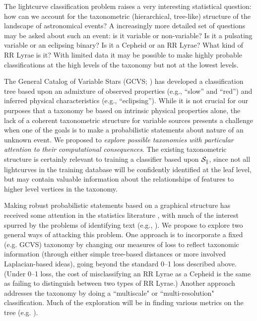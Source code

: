The lightcurve classification problem raises a very interesting statistical
question: how can we account for the taxonometric (hierarchical, tree-like)
structure of the landscape of astronomical events? A increasingly more detailed
set of questions may be asked about such an event: is it variable or
non-variable? Is it a pulsating variable or an eclipsing binary?  Is it a
Cepheid or an RR Lyrae? What kind of RR Lyrae is it?  With limited data it may
be possible to make highly probable classifications at the high levels of the
taxonomy but not at the lowest levels.

The General Catalog of Variable Stars (GCVS; \citealt{ksf+96}) has developed a
classification tree based upon an admixture of observed properties (e.g.,
``slow'' and ``red'') and inferred physical characteristics (e.g.,
``eclipsing'').  While it is not crucial for our purposes that a taxonomy be
based on intrinsic physical properties alone, the lack of a coherent
taxonometric structure for variable sources presents a challenge when one of the
goals is to make a  probabilistic statements about nature of an unknown event.
We proposed to {\it explore possible taxonomies with particular attention to
their computational consequences}.  The existing taxonometric structure is
certainly relevant to training a classifier based upon $\cal S_k$, since not all
lightcurves in the training database will be confidently identified at the leaf
level, but may contain valuable information about the relationships of features
to higher level vertices in the taxonomy.

Making robust probabilistic statements based on a graphical structure has
received some attention in the statistics literature
\citep{DBLP:conf/icml/KollerS97,DBLP:conf/icdm/SunL01,DBLP:conf/icml/DekelKS04,
CesaBianchi06,  bcmt-lmmsc-04}, with much of the interest spurred by the
problems of identifying text (e.g., \citealt{593971}). We propose to explore two
general ways of attacking this problem. One approach is to incorporate a fixed
(e.g. GCVS) taxonomy by changing our measures of loss to reflect taxonomic
information (through either simple tree-based distances or more involved
Laplacian-based ideas), going beyond the standard 0--1 loss described above.
(Under 0--1 loss, the cost of misclassifying an RR Lyrae as a Cepheid is the
same as failing to distinguish between two types of RR Lyrae.) Another approach
addresses the taxonomy by doing a ``multiscale" or ``multi-resolution"
classification. Much of the exploration will be in finding various metrics on
the tree (e.g. \cite{ChungSpectralGraphTheoryBook97}).

